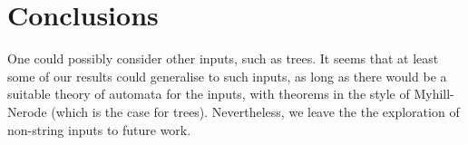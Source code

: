 \section{Conclusions}
\label{sec:conclusions}
One could possibly consider other inputs, such as trees. It seems that at least some of our results could generalise to such inputs, as long as there would be a suitable theory of automata for the inputs, with theorems in the style of Myhill-Nerode (which is the case for trees). Nevertheless, we leave the the exploration of non-string inputs to future work.